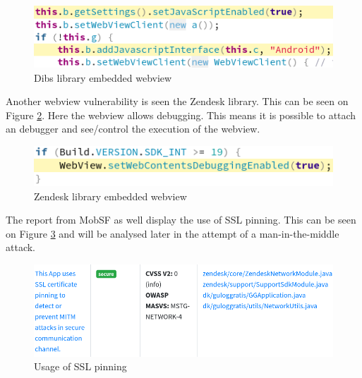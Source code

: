 \begin{figure}[htbp]
    \centering
    \includegraphics[width=1\columnwidth]{../static-analysis/pictures/dibs-javascript.png}
    \caption{Dibs library embedded webview}
    \label{fig:dibs-webview}
\end{figure}

Another webview vulnerability is seen the Zendesk library. This can be seen on Figure \ref{fig:zendesk-webview}. Here the webview allows debugging. This means it is possible to attach an debugger and see/control the execution of the webview.    

\begin{figure}[htbp]
    \centering
    \includegraphics[width=1\columnwidth]{../static-analysis/pictures/zendesk-webview.png}
    \caption{Zendesk library embedded webview}
    \label{fig:zendesk-webview}
\end{figure}

The report from MobSF as well display the use of SSL pinning. This can be seen on Figure \ref{fig:ssl-pinning} and will be analysed later in the attempt of a man-in-the-middle attack. 

\begin{figure}[htbp]
    \centering
    \includegraphics[width=1\columnwidth]{../static-analysis/pictures/ssl-pinning.png}
    \caption{Usage of SSL pinning}
    \label{fig:ssl-pinning}
\end{figure}

